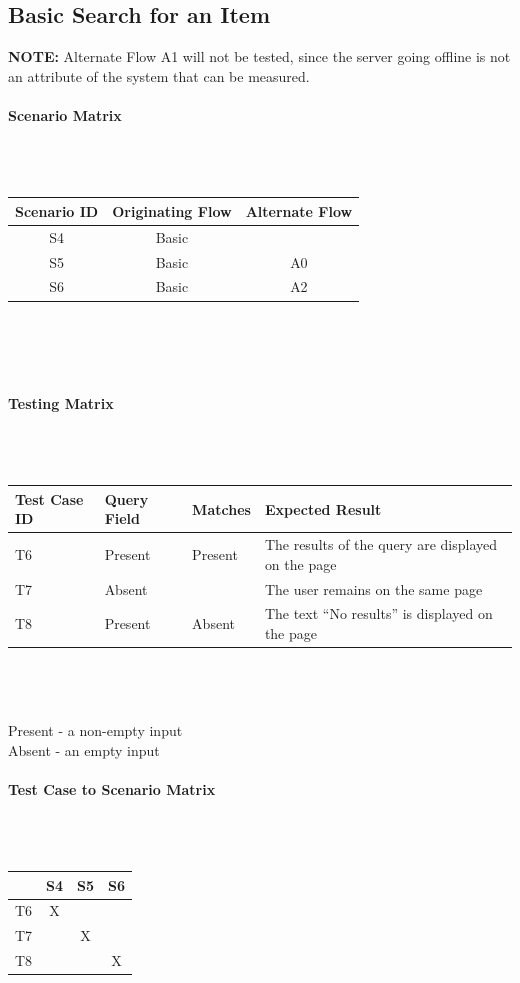 \documentclass{article}
\begin{document}
\subsection{Basic Search for an Item}
\textbf{NOTE:} Alternate Flow A1 will not be tested, since the server going offline is not an attribute of the system that can be measured.

\paragraph{Scenario Matrix}~\\ \\
\begin{tabular}{ c  c  c }
\hline
Scenario ID & Originating Flow & Alternate Flow\\
\hline
\hline
S4 & Basic &  \\
\hline
S5 & Basic & A0 \\
\hline
S6 & Basic & A2 \\
\hline
\end{tabular}\\
~\\
~\\
\paragraph{Testing Matrix}~\\ \\
\begin{tabular}{ p{0.8in}  p{0.75in}  p{0.5in}  p{3in} }
\hline
Test Case ID & Query Field & Matches & Expected Result\\
\hline
\hline
T6 & Present & Present & The results of the query are displayed on the page\\
\hline
T7 & Absent & & The user remains on the same page\\
\hline
T8 & Present & Absent & The text ``No results'' is displayed on the page\\
\hline
\end{tabular}\\
~\\
~\\
Present - a non-empty input\\
Absent - an empty input
\paragraph{Test Case to Scenario Matrix}~\\ \\
\begin{tabular}{ | c || c | c | c | }
\hline
   & S4 & S5 & S6 \\
\hline
\hline
T6 & X  &    &    \\
\hline
T7 &    & X  &    \\
\hline
T8 &    &    & X  \\
\hline
\end{tabular}
\end{document}
